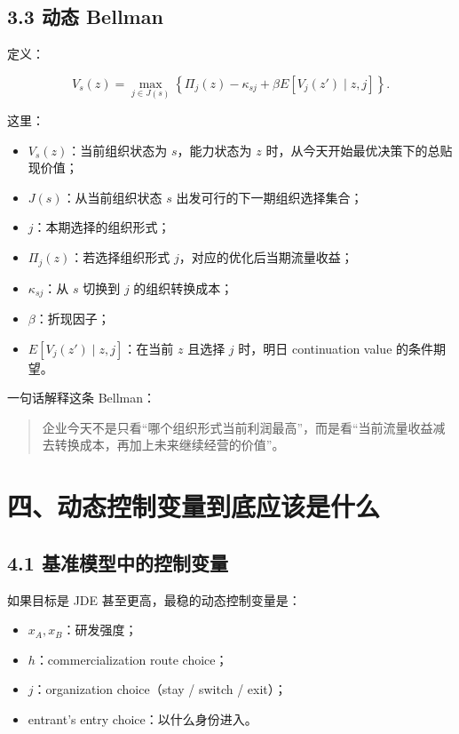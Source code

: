 \documentclass[12pt,fontset=none]{ctexart}
\begin{document}
\subsection{3.3 动态 Bellman}

定义：

\[
V_s(z)=
\max_{j\in J(s)}
\left\{
\Pi_j(z)-\kappa_{sj}
+\beta E[V_j(z')\mid z,j]
\right\}.
\]

这里：

\begin{itemize}[leftmargin=2em]
    \item \(V_s(z)\)：当前组织状态为 \(s\)，能力状态为 \(z\) 时，从今天开始最优决策下的总贴现价值；
    \item \(J(s)\)：从当前组织状态 \(s\) 出发可行的下一期组织选择集合；
    \item \(j\)：本期选择的组织形式；
    \item \(\Pi_j(z)\)：若选择组织形式 \(j\)，对应的优化后当期流量收益；
    \item \(\kappa_{sj}\)：从 \(s\) 切换到 \(j\) 的组织转换成本；
    \item \(\beta\)：折现因子；
    \item \(E[V_j(z')\mid z,j]\)：在当前 \(z\) 且选择 \(j\) 时，明日 continuation value 的条件期望。
\end{itemize}

一句话解释这条 Bellman：

\begin{quote}
企业今天不是只看“哪个组织形式当前利润最高”，而是看“当前流量收益减去转换成本，再加上未来继续经营的价值”。
\end{quote}

\section{四、动态控制变量到底应该是什么}

\subsection{4.1 基准模型中的控制变量}

如果目标是 JDE 甚至更高，最稳的动态控制变量是：

\begin{itemize}[leftmargin=2em]
    \item \(x_A, x_B\)：研发强度；
    \item \(h\)：commercialization route choice；
    \item \(j\)：organization choice（stay / switch / exit）；
    \item entrant's entry choice：以什么身份进入。
\end{itemize}
\end{document}
